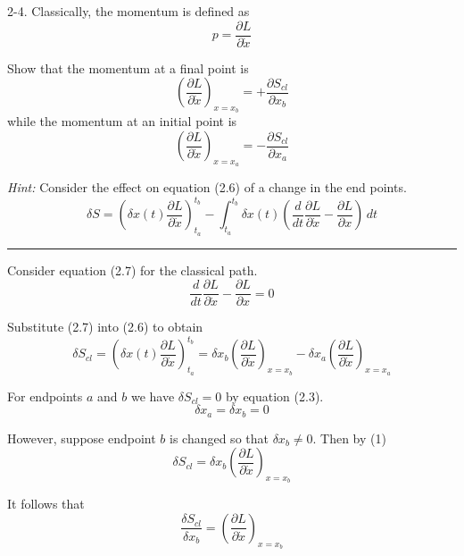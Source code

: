 \documentclass[12pt]{article}
\begin{document}
2-4.
Classically, the momentum is defined as
\begin{equation*}
p=\frac{\partial L}{\partial\dot x}
\tag{2.10}
\end{equation*}

Show that the momentum at a final point is
\begin{equation*}
\left(\frac{\partial L}{\partial\dot x}\right)_{x=x_b}
=+\frac{\partial S_{cl}}{\partial x_b}
\tag{2.11}
\end{equation*}
while the momentum at an initial point is
\begin{equation*}
\left(\frac{\partial L}{\partial\dot x}\right)_{x=x_a}
=-\frac{\partial S_{cl}}{\partial x_a}
\end{equation*}

{\it Hint:} Consider the effect on equation (2.6)
of a change in the end points.
\begin{equation*}
\delta S=\left(\delta x(t)\frac{\partial L}{\partial\dot x}\right)_{t_a}^{t_b}
-\int_{t_a}^{t_b}\delta x(t)
\left(\frac{d}{dt}\frac{\partial L}{\partial\dot x}
-\frac{\partial L}{\partial x}\right)\,dt
\tag{2.6}
\end{equation*}

\bigskip
\hrule

\bigskip
Consider equation (2.7) for the classical path.
\begin{equation*}
\frac{d}{dt}\frac{\partial L}{\partial\dot x}
-\frac{\partial L}{\partial x}=0
\tag{2.7}
\end{equation*}

Substitute (2.7) into (2.6) to obtain
\begin{equation*}
\delta S_{cl}=\left(\delta x(t)\frac{\partial L}{\partial\dot x}\right)_{t_a}^{t_b}
=\delta x_b\left(\frac{\partial L}{\partial\dot x}\right)_{x=x_b}
-\delta x_a\left(\frac{\partial L}{\partial\dot x}\right)_{x=x_a}
\tag{1}
\end{equation*}

For endpoints $a$ and $b$ we have $\delta S_{cl}=0$ by equation (2.3).
\begin{equation*}
\delta x_a=\delta x_b=0
\tag{2.3}
\end{equation*}

However, suppose endpoint $b$ is changed so that $\delta x_b\ne0$.
Then by (1)
\begin{equation*}
\delta S_{cl}=\delta x_b\left(\frac{\partial L}{\partial\dot x}\right)_{x=x_b}
\end{equation*}

It follows that
\begin{equation*}
\frac{\delta S_{cl}}{\delta x_b}
=\left(\frac{\partial L}{\partial\dot x}\right)_{x=x_b}
\end{equation*}
\end{document}
